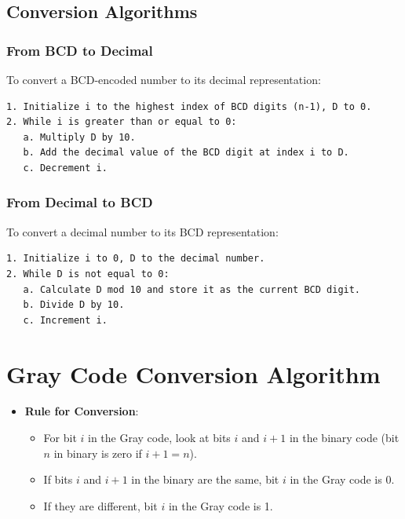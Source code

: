 \documentclass[12pt,openany]{book}
\begin{document}
	\subsection{Conversion Algorithms}
	
	\subsubsection{From BCD to Decimal}
	
	To convert a BCD-encoded number to its decimal representation:
	
	\begin{verbatim}
1. Initialize i to the highest index of BCD digits (n-1), D to 0.
2. While i is greater than or equal to 0:
   a. Multiply D by 10.
   b. Add the decimal value of the BCD digit at index i to D.
   c. Decrement i.
	\end{verbatim}
	
	\subsubsection{From Decimal to BCD}
	
	To convert a decimal number to its BCD representation:
	
	\begin{verbatim}
1. Initialize i to 0, D to the decimal number.
2. While D is not equal to 0:
   a. Calculate D mod 10 and store it as the current BCD digit.
   b. Divide D by 10.
   c. Increment i.
	\end{verbatim}
	
	\newpage
	\section{Gray Code Conversion Algorithm}
	\begin{itemize}
		\item[] \textbf{Rule for Conversion}:
		      \begin{itemize}
		      	\item[] For bit \( i \) in the Gray code, look at bits \( i \) and \( i+1 \) in the binary code (bit \( n \) in binary is zero if \( i+1 = n \)).
		      	\item[] If bits \( i \) and \( i+1 \) in the binary are the same, bit \( i \) in the Gray code is 0.
		      	\item[] If they are different, bit \( i \) in the Gray code is 1.
		      \end{itemize}
	\end{itemize}
	
\end{document}
